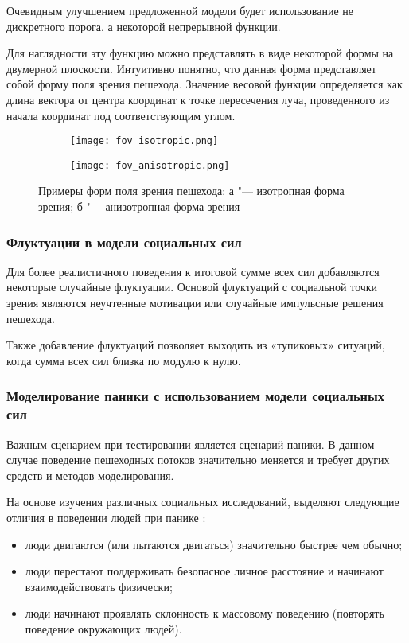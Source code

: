 Очевидным улучшением предложенной модели будет использование не дискретного порога, а некоторой непрерывной функции.

Для наглядности эту функцию можно представлять в виде некоторой формы на двумерной плоскости.
Интуитивно понятно, что данная форма представляет собой форму поля зрения пешехода.
Значение весовой функции определяется как длина вектора от центра координат к точке пересечения луча, проведенного из начала координат под соответствующим углом.

\begin{figure}[ht]
\centering
  \begin{subfigure}[b]{0.45\textwidth}
    \centering
    \texttt{[image: fov\_isotropic.png]}
    \caption{}
  \end{subfigure}
  \begin{subfigure}[b]{0.45\textwidth}
    \centering
    \texttt{[image: fov\_anisotropic.png]}
    \caption{}
  \end{subfigure}
  \caption{ Примеры форм поля зрения пешехода: а "--- изотропная форма зрения;
            б "--- анизотропная форма зрения}
  \label{sec:model:sf:fov:example_figure}
\end{figure}

\subsubsection{Флуктуации в модели социальных сил}
\label{sec:model:sf:fluctuation}

Для более реалистичного поведения к итоговой сумме всех сил добавляются некоторые случайные флуктуации.
Основой флуктуаций с социальной точки зрения являются неучтенные мотивации или случайные импульсные решения пешехода.

Также добавление флуктуаций позволяет выходить из «тупиковых» ситуаций, когда сумма всех сил близка по модулю к нулю.

\subsubsection{Моделирование паники с использованием модели социальных сил}
\label{sec:model:sf:panic}

Важным сценарием при тестировании является сценарий паники. В данном случае поведение пешеходных потоков значительно меняется и требует других средств и методов моделирования.

На основе изучения различных социальных исследований, выделяют следующие отличия в поведении людей при панике \cite{helbing_panic}:
\begin{itemize}
  \item люди двигаются (или пытаются двигаться) значительно быстрее чем обычно;
  \item люди перестают поддерживать безопасное личное расстояние и начинают взаимодействовать физически;
  \item люди начинают проявлять склонность к массовому поведению (повторять поведение окружающих людей).
\end{itemize}

